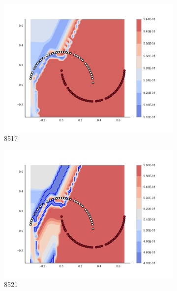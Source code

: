 \begin{figure}[h]
\begin{subfigure}[b]{0.09\textwidth}
    \includegraphics[clip, trim=2.35cm 1.75cm 4.5cm 0cm,width=\textwidth]{img/convergence/8517.pdf}
    \caption{8517}
    \label{fig:convergence_8517}
\end{subfigure}
%
\begin{subfigure}[b]{0.09\textwidth}
    \includegraphics[clip, trim=2.35cm 1.75cm 4.5cm 0cm,width=\textwidth]{img/convergence/8521.pdf}
    \caption{8521}
    \label{fig:convergence_8521}
\end{subfigure}
%
\begin{subfigure}[b]{0.09\textwidth}

\end{subfigure}
\end{figure}
